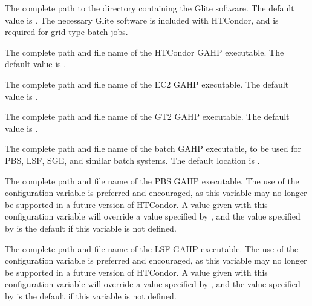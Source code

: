 \begin{description}
\label{param:GLITELocation}
\item[\Macro{GLITE\_LOCATION}]
  The complete path to the directory containing the Glite software.
  The default value is .
  The necessary Glite software is included with HTCondor,
  and is required for grid-type batch jobs.

\label{param:CondorGAHP}
\item[\Macro{CONDOR\_GAHP}]
  The complete path and file name of the HTCondor GAHP executable.
  The default value is .

\label{param:EC2GAHP}
\item[\Macro{EC2\_GAHP}]
  The complete path and file name of the EC2 GAHP executable.
  The default value is .

\label{param:GT2GAHP}
\item[\Macro{GT2\_GAHP}]
  The complete path and file name of the GT2 GAHP executable.
  The default value is .

\label{param:BatchGAHP}
\item[\Macro{BATCH\_GAHP}]
  The complete path and file name of the batch GAHP executable,
  to be used for PBS, LSF, SGE, and similar batch systems.
  The default location is
  .

\label{param:PBSGAHP}
\item[\Macro{PBS\_GAHP}]
  The complete path and file name of the PBS GAHP executable.
  The use of the configuration variable 
  is preferred and encouraged,
  as this variable may no longer be supported in a future
  version of HTCondor.
  A value given with this configuration variable will override
  a value specified by ,
  and the value specified by  is the default
  if this variable is not defined.

\label{param:LSFGAHP}
\item[\Macro{LSF\_GAHP}]
  The complete path and file name of the LSF GAHP executable.
  The use of the configuration variable 
  is preferred and encouraged,
  as this variable may no longer be supported in a future
  version of HTCondor.
  A value given with this configuration variable will override
  a value specified by ,
  and the value specified by  is the default
  if this variable is not defined.


\end{description}
